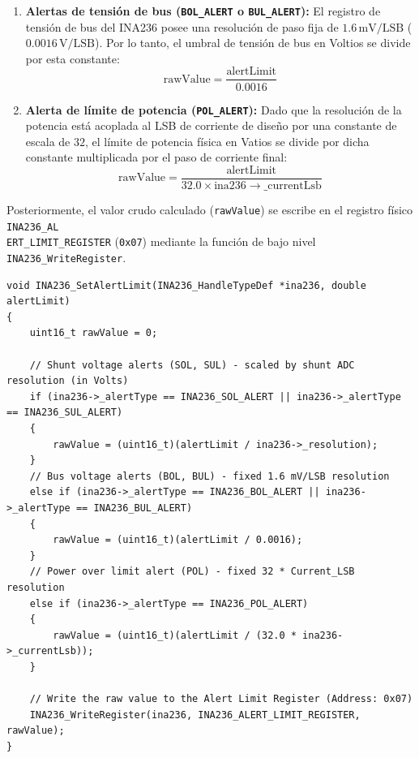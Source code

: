 \documentclass[
10pt, %
a4paper, %
oneside, %
headinclude,footinclude, %
BCOR5mm, %
]{scrartcl}
\begin{document}
\begin{itemize}
\begin{enumerate}
			\item \textbf{Alertas de tensión de bus (\texttt{BOL\_ALERT} o \texttt{BUL\_ALERT}):} El registro de tensión de bus del INA236 posee una resolución de paso fija de $1.6\,\text{mV/LSB}$ ($0.0016\,\text{V/LSB}$). Por lo tanto, el umbral de tensión de bus en Voltios se divide por esta constante:
				\begin{equation}
					\text{rawValue} = \frac{\text{alertLimit}}{0.0016}
				\end{equation}
			\item \textbf{Alerta de límite de potencia (\texttt{POL\_ALERT}):} Dado que la resolución de la potencia está acoplada al LSB de corriente de diseño por una constante de escala de $32$, el límite de potencia física en Vatios se divide por dicha constante multiplicada por el paso de corriente final:
				\begin{equation}
					\text{rawValue} = \frac{\text{alertLimit}}{32.0 \times \text{ina236}\rightarrow\text{\_currentLsb}}
				\end{equation}
		\end{enumerate}
		Posteriormente, el valor crudo calculado (\texttt{rawValue}) se escribe en el registro físico \texttt{INA236\_AL\\ERT\_LIMIT\_REGISTER} (\texttt{0x07}) mediante la función de bajo nivel \texttt{INA236\_WriteRegister}.
\end{itemize}

\begin{lstlisting}[style=CMakeStyle]
void INA236_SetAlertLimit(INA236_HandleTypeDef *ina236, double alertLimit)
{
    uint16_t rawValue = 0;

    // Shunt voltage alerts (SOL, SUL) - scaled by shunt ADC resolution (in Volts)
    if (ina236->_alertType == INA236_SOL_ALERT || ina236->_alertType == INA236_SUL_ALERT)
    {
        rawValue = (uint16_t)(alertLimit / ina236->_resolution);
    }
    // Bus voltage alerts (BOL, BUL) - fixed 1.6 mV/LSB resolution
    else if (ina236->_alertType == INA236_BOL_ALERT || ina236->_alertType == INA236_BUL_ALERT)
    {
        rawValue = (uint16_t)(alertLimit / 0.0016);
    }
    // Power over limit alert (POL) - fixed 32 * Current_LSB resolution
    else if (ina236->_alertType == INA236_POL_ALERT)
    {
        rawValue = (uint16_t)(alertLimit / (32.0 * ina236->_currentLsb));
    }

    // Write the raw value to the Alert Limit Register (Address: 0x07)
    INA236_WriteRegister(ina236, INA236_ALERT_LIMIT_REGISTER, rawValue);
}
\end{lstlisting}
\end{document}
